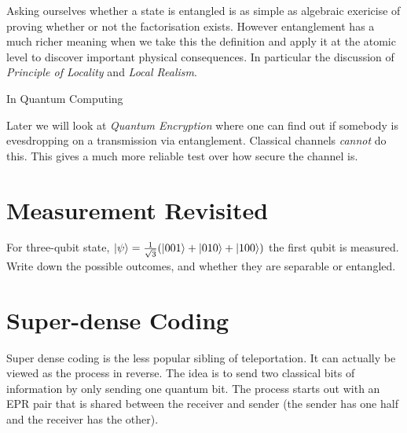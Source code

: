 
Asking ourselves whether a state is entangled is as simple as algebraic 
exericise of proving whether or not the factorisation exists. 
However entanglement has a much richer meaning when we take this 
the definition and apply it at the atomic level to discover important physical consequences. 
In particular the discussion of \textit{Principle of Locality} and \textit{Local Realism}.


In Quantum Computing

Later we will look at \textit{Quantum Encryption} where one can find out if somebody is 
evesdropping on a transmission via entanglement. Classical channels \textit{cannot} do this.
This gives a much more reliable test over how secure the channel is. 

\section{Measurement Revisited}


\begin{example}
For three-qubit state, $\left|\psi\right\rangle = \frac{1}{\sqrt{3}}(\left|001\right\rangle + \left|010\right\rangle + \left|100\right\rangle)$
the first qubit is measured. Write down the possible outcomes,
and whether they are separable or entangled.


\end{example}






\section{Super-dense Coding}

Super dense coding is the less popular sibling of teleportation. It can actually be viewed as the
process in reverse. The idea is to send two classical bits of information by only sending one
quantum bit. The process starts out with an EPR pair that is shared between the receiver and
sender (the sender has one half and the receiver has the other).


